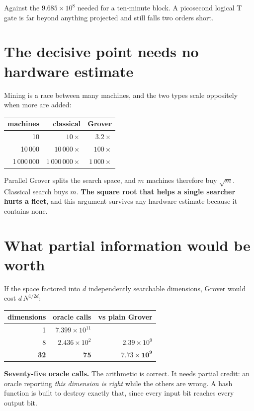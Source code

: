 Against the \(9.685 \times 10^{8}\) needed for a ten-minute block. A picosecond logical T gate is far
beyond anything projected and still falls two orders short.

\section{The decisive point needs no hardware estimate}

Mining is a race between many machines, and the two types scale oppositely when more are added:

\begin{center}
\begin{tabular}{rrr}
\toprule
machines & classical & Grover \\
\midrule
10 & \(10\times\) & \(3.2\times\) \\
10\,000 & \(10\,000\times\) & \(100\times\) \\
1\,000\,000 & \(1\,000\,000\times\) & \(1\,000\times\) \\
\bottomrule
\end{tabular}
\end{center}

Parallel Grover splits the search space, and \(m\) machines therefore buy \(\sqrt{m}\). Classical search buys
\(m\). \textbf{The square root that helps a single searcher hurts a fleet}, and this argument
survives any hardware estimate because it contains none.

\section{What partial information would be worth}

If the space factored into \(d\) independently searchable dimensions, Grover would cost
\(d\,N^{1/2d}\):

\begin{center}
\begin{tabular}{rrr}
\toprule
dimensions & oracle calls & vs plain Grover \\
\midrule
1 & \(7.399 \times 10^{11}\) & \\
8 & \(2.436 \times 10^{2}\) & \(2.39 \times 10^{9}\) \\
\textbf{32} & \(\mathbf{75}\) & \(\mathbf{7.73 \times 10^{9}}\) \\
\bottomrule
\end{tabular}
\end{center}

\textbf{Seventy-five oracle calls.} The arithmetic is correct. It needs partial credit: an
oracle reporting \emph{this dimension is right} while the others are wrong. A hash function is built
to destroy exactly that, since every input bit reaches every output bit.

